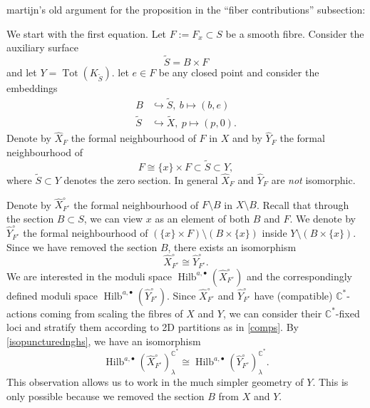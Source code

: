 \documentclass{amsart}
\theoremstyle{definition}
\newcommand{\CC} {\mathbb{C}}          %
\newcommand{\Hilb}{\operatorname{Hilb}}
\newcommand{\Tot}{\operatorname{Tot}}
\newcommand{\Xhat}{\widehat{X}}
\begin{document}
 martijn's old argument for the proposition in the ``fiber
 contributions'' subsection:

We start with the first equation. Let $F := F_x \subset S$ be a smooth fibre. Consider the auxiliary surface 
$$
\tilde{S} = B \times F
$$ 
and let $Y = \Tot(K_{\tilde{S}})$. 
let $e \in F$ be any closed point and consider the embeddings 
\begin{align*}
B &\hookrightarrow \tilde{S}, \ b \mapsto (b,e) \\
\tilde{S} &\hookrightarrow \tilde{X}, \ p \mapsto (p,0).
\end{align*}
Denote by $\Xhat _F$ the formal neighbourhood of $F$ in $X$ and by $\widehat{Y}_{F}$ the formal neighbourhood of
$$
F \cong \{x\} \times F \subset \tilde{S} \subset Y,
$$
where $\tilde{S} \subset Y$ denotes the zero section. In general $\Xhat _F$ and $\widehat{Y}_{F}$ are \emph{not} isomorphic. 

Denote by $\Xhat ^{\circ}_{F^\circ}$ the formal neighbourhood of $F \setminus B$ in $X \setminus B$. Recall that through the section $B \subset S$, we can view $x$ as an element of both $B$ and $F$.  We denote by $\widehat{Y}_{F^{\circ}}^{\circ}$ the formal neighbourhood of $(\{x\} \times F) \setminus (B \times \{x\})$ inside $Y \setminus (B \times \{x\})$. Since we have removed the section $B$, there exists an isomorphism  
\begin{equation} \label{isopuncturednghs}
\Xhat ^{\circ}_{F^\circ} \cong \widehat{Y}_{F^{\circ}}^{\circ}.
\end{equation}
We are interested in the moduli space $\Hilb^{a,\bullet}(\Xhat ^{\circ}_{F^\circ})$ and the correspondingly defined moduli space $\Hilb^{a,\bullet}(\widehat{Y}^{\circ}_{F^\circ})$. Since $\Xhat ^{\circ}_{F^\circ}$ and $\widehat{Y}^{\circ}_{F^\circ}$ have (compatible) $\CC^*$-actions coming from scaling the fibres of $X$ and $Y$, we can consider their $\CC^*$-fixed loci and stratify them according to 2D partitions as in \eqref{comps}. By \eqref{isopuncturednghs}, we have an isomorphism   
$$
\Hilb^{a,\bullet}(\Xhat ^{\circ}_{F^\circ})_{\lambda}^{\CC^*} \cong \Hilb^{a,\bullet}(\widehat{Y}^{\circ}_{F^\circ})_{\lambda}^{\CC^*}.
$$
This observation allows us to work in the much simpler geometry of $Y$. This is only possible because we removed the section $B$ from $X$ and $Y$.
\end{document}
